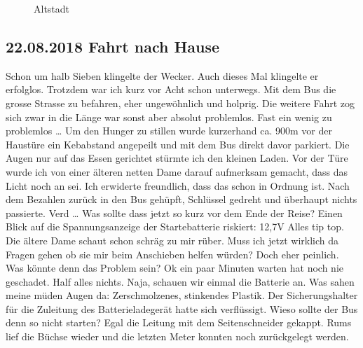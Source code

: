 \begin{figure}[H]
   \centering
   \quad
   \quad
   \caption[Altstadt]{Altstadt}
\end{figure}

\newpage

\subsection{22.08.2018 Fahrt nach Hause}
Schon um halb Sieben klingelte der Wecker.
Auch dieses Mal klingelte er erfolglos.
Trotzdem war ich kurz vor Acht schon unterwegs.
Mit dem Bus die grosse Strasse zu befahren, eher ungewöhnlich und holprig.
Die weitere Fahrt zog sich zwar in die Länge war sonst aber absolut problemlos.
Fast ein wenig zu problemlos \dots
Um den Hunger zu stillen wurde kurzerhand ca. 900m vor der Haustüre ein Kebabstand angepeilt und mit dem Bus direkt davor parkiert.
Die Augen nur auf das Essen gerichtet stürmte ich den kleinen Laden.
Vor der Türe wurde ich von einer älteren netten Dame darauf aufmerksam gemacht, dass das Licht noch an sei.
Ich erwiderte freundlich, dass das schon in Ordnung ist.
Nach dem Bezahlen zurück in den Bus gehüpft, Schlüssel gedreht und überhaupt nichts passierte.
Verd \dots
Was sollte dass jetzt so kurz vor dem Ende der Reise?
Einen Blick auf die Spannungsanzeige der Startebatterie riskiert: 12,7V
Alles tip top.
Die ältere Dame schaut schon schräg zu mir rüber.
Muss ich jetzt wirklich da Fragen gehen ob sie mir beim Anschieben helfen würden?
Doch eher peinlich.
Was könnte denn das Problem sein?
Ok ein paar Minuten warten hat noch nie geschadet.
Half alles nichts.
Naja, schauen wir einmal die Batterie an.
Was sahen meine müden Augen da:
Zerschmolzenes, stinkendes Plastik.
Der Sicherungshalter für die Zuleitung des Batterieladegerät hatte sich verflüssigt.
Wieso sollte der Bus denn so nicht starten?
Egal die Leitung mit dem Seitenschneider gekappt.
Rums lief die Büchse wieder und die letzten Meter konnten noch zurückgelegt werden.

